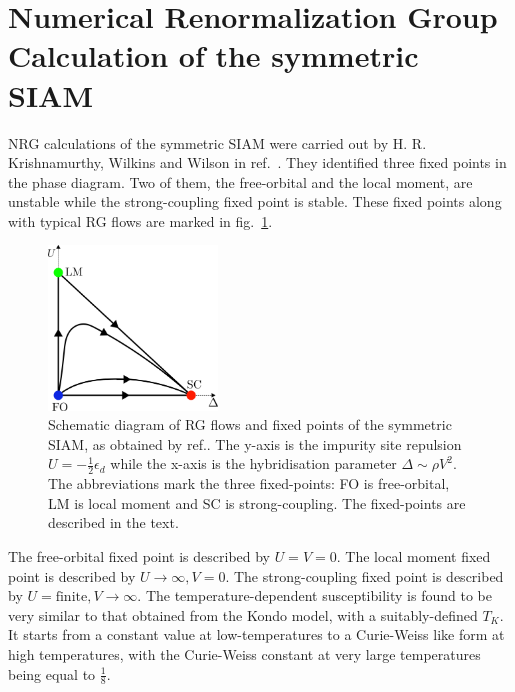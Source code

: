 \section{Numerical Renormalization Group Calculation of the symmetric SIAM}
NRG calculations of the symmetric SIAM were carried out by H. R. Krishnamurthy, Wilkins and Wilson in ref.~\cite{hrk-nrg}. They identified three fixed points in the phase diagram. Two of them, the free-orbital and the local moment, are unstable while the strong-coupling fixed point is stable. These fixed points along with typical RG flows are marked in fig.~\ref{nrg_fp}.
\begin{figure}[htpb]
	\centering
	\includegraphics[width=0.4\textwidth]{../figures/nrg_fpoints.png}
	\caption{Schematic diagram of RG flows and fixed points of the symmetric SIAM, as obtained by ref.\cite{hrk-nrg}. The y-axis is the impurity site repulsion \(U = -\frac{1}{2}\epsilon_d\) while the x-axis is the hybridisation parameter \(\Delta \sim \rho V^2\). The abbreviations mark the three fixed-points: FO is free-orbital, LM is local moment and SC is strong-coupling. The fixed-points are described in the text.}
	\label{nrg_fp}
\end{figure}
The free-orbital fixed point is described by \(U=V=0\). The local moment fixed point is described by \(U \to \infty, V=0\). The strong-coupling fixed point is described by \(U=\text{finite}, V \to \infty\). The temperature-dependent susceptibility is found to be very similar to that obtained from the Kondo model, with a suitably-defined \(T_K\). It starts from a constant value at low-temperatures to a Curie-Weiss like form at high temperatures, with the Curie-Weiss constant at very large temperatures being equal to \(\frac{1}{8}\).
